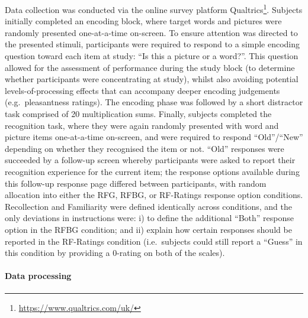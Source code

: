 \documentclass[
  11pt,
]{article}
\begin{document}
Data collection was conducted via the online survey platform
Qualtrics\footnote{\url{https://www.qualtrics.com/uk/}}. Subjects
initially completed an encoding block, where target words and pictures
were randomly presented one-at-a-time on-screen. To ensure attention was
directed to the presented stimuli, participants were required to respond
to a simple encoding question toward each item at study: ``Is this a
picture or a word?''. This question allowed for the assessment of
performance during the study block (to determine whether participants
were concentrating at study), whilst also avoiding potential
levels-of-processing effects that can accompany deeper encoding
judgements (e.g.~pleasantness ratings). The encoding phase was followed
by a short distractor task comprised of 20 multiplication sums. Finally,
subjects completed the recognition task, where they were again randomly
presented with word and picture items one-at-a-time on-screen, and were
required to respond ``Old''/``New'' depending on whether they recognised
the item or not. ``Old'' responses were succeeded by a follow-up screen
whereby participants were asked to report their recognition experience
for the current item; the response options available during this
follow-up response page differed between participants, with random
allocation into either the RFG, RFBG, or RF-Ratings response option
conditions. Recollection and Familiarity were defined identically across
conditions, and the only deviations in instructions were: i) to define
the additional ``Both'' response option in the RFBG condition; and ii)
explain how certain responses should be reported in the RF-Ratings
condition (i.e.~subjects could still report a ``Guess'' in this
condition by providing a 0-rating on both of the scales).

\hypertarget{data-processing}{%
\paragraph{Data processing}\label{data-processing}}
\end{document}
